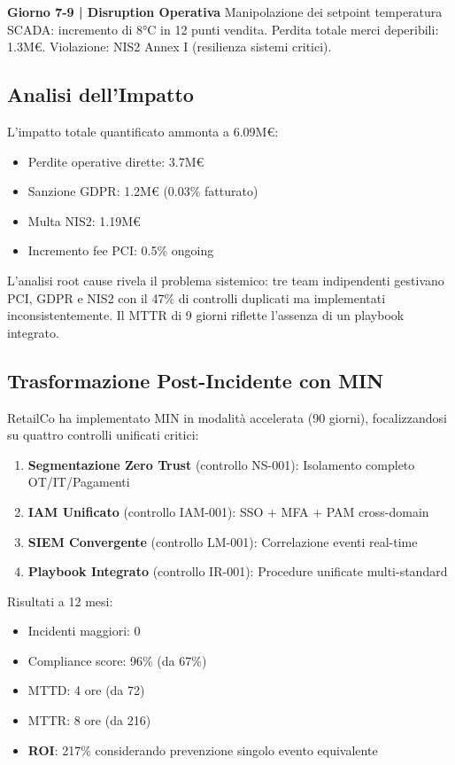 \textbf{Giorno 7-9 | Disruption Operativa}
Manipolazione dei setpoint temperatura SCADA: incremento di 8°C in 12 punti vendita. Perdita totale merci deperibili: 1.3M€. Violazione: NIS2 Annex I (resilienza sistemi critici).

\subsection{\texorpdfstring{Analisi dell'Impatto}{4.4.2 - Analisi dell'Impatto}}

L'impatto totale quantificato ammonta a 6.09M€:
\begin{itemize}
\item Perdite operative dirette: 3.7M€
\item Sanzione GDPR: 1.2M€ (0.03\% fatturato)
\item Multa NIS2: 1.19M€
\item Incremento fee PCI: 0.5\% ongoing
\end{itemize}

L'analisi root cause rivela il problema sistemico: tre team indipendenti gestivano PCI, GDPR e NIS2 con il 47\% di controlli duplicati ma implementati inconsistentemente. Il MTTR di 9 giorni riflette l'assenza di un playbook integrato.

\subsection{\texorpdfstring{Trasformazione Post-Incidente con MIN}{4.4.3 - Trasformazione con MIN}}

RetailCo ha implementato MIN in modalità accelerata (90 giorni), focalizzandosi su quattro controlli unificati critici:

\begin{enumerate}
\item \textbf{Segmentazione Zero Trust} (controllo NS-001): Isolamento completo OT/IT/Pagamenti
\item \textbf{IAM Unificato} (controllo IAM-001): SSO + MFA + PAM cross-domain
\item \textbf{SIEM Convergente} (controllo LM-001): Correlazione eventi real-time
\item \textbf{Playbook Integrato} (controllo IR-001): Procedure unificate multi-standard
\end{enumerate}

Risultati a 12 mesi:
\begin{itemize}
\item Incidenti maggiori: 0
\item Compliance score: 96\% (da 67\%)
\item MTTD: 4 ore (da 72)
\item MTTR: 8 ore (da 216)
\item \textbf{ROI}: 217\% considerando prevenzione singolo evento equivalente
\end{itemize}

